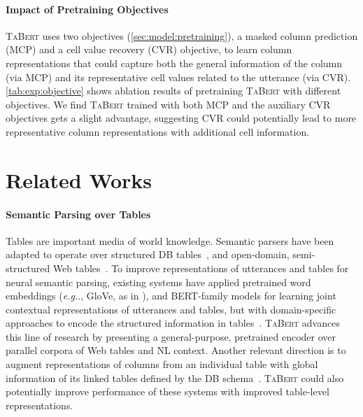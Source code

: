 \documentclass[11pt,a4paper]{article}
\def\model/{\textsc{TaBert}}
\newcommand{\eg}{\hbox{\emph{e.g.}}\xspace}
\begin{document}
\paragraph{Impact of Pretraining Objectives} 
\model/ uses two objectives (\autoref{sec:model:pretraining}), a masked column prediction (MCP) and a cell value recovery (CVR) objective, to learn column representations that could capture both the general information of the column (via MCP) and its representative cell values related to the utterance (via CVR).
\autoref{tab:exp:objective} shows ablation results of pretraining \model/ with different objectives.
We find \model/ trained with both MCP and the auxiliary CVR objectives gets a slight advantage, suggesting CVR could potentially lead to more representative column representations with additional cell information.


\section{Related Works}


\paragraph{Semantic Parsing over Tables}
Tables are important media of world knowledge.
Semantic parsers have been adapted to operate over structured DB  tables~\cite{wang15overnight,xu2017sqlnet,dong18coarsefine,Yu2018SyntaxSQLNetST,Shi2018IncSQLTI,Wang2018RobustTG}, and open-domain, semi-structured Web tables~\cite{pasupat2015compositional,Sun2016TableCS,DBLP:journals/corr/NeelakantanLS15}.
To improve representations of utterances and tables for neural semantic parsing, existing systems have applied pretrained word embeddings (\eg., GloVe, as in \citet{DBLP:journals/corr/abs-1709-00103,yu18typesql,sun18sql,liang18mapo}), and BERT-family models for learning joint contextual representations of utterances and tables, but with domain-specific approaches to encode the structured information in tables~\cite{Hwang2019ACE,He2019XSQLRS,Guo2019TowardsCT,Zhang2019EditingBasedSQ}.
\model/ advances this line of research by presenting a general-purpose, pretrained encoder over parallel corpora of Web tables and NL context.
Another relevant direction is to augment representations of columns from an individual table with global information of its linked tables defined by the DB schema~\cite{Bogin2019GlobalRO,Wang2019RATSQLRS}.
\model/ could also potentially improve performance of these systems with improved table-level representations.
\end{document}
